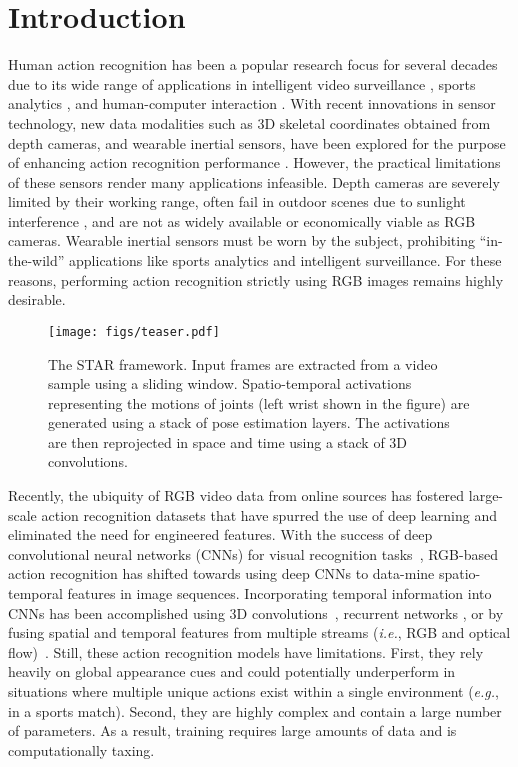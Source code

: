 \documentclass[10pt, conference, compsocconf]{IEEEtran}
\begin{document}
\IEEEpeerreviewmaketitle



\section{Introduction}
Human action recognition has been a popular research focus for several decades due to its wide range of applications in intelligent video surveillance \cite{ji20133d}, sports analytics \cite{fani2017hockey}, and human-computer interaction \cite{mitra2007gesture}. With recent innovations in sensor technology, new data modalities such as 3D skeletal coordinates obtained from depth cameras, and wearable inertial sensors, have been explored for the purpose of enhancing action recognition performance \cite{chen2016fusion, du2015hierarchical, liu2016spatio}. However, the practical limitations of these sensors render many applications infeasible. Depth cameras are severely limited by their working range, often fail in outdoor scenes due to sunlight interference \cite{mehta2017vnect}, and are not as widely available or economically viable as RGB cameras. Wearable inertial sensors must be worn by the subject, prohibiting ``in-the-wild'' applications like sports analytics and intelligent surveillance. For these reasons, performing action recognition strictly using RGB images remains highly desirable. 

\begin{figure}
    \centering
    \texttt{[image: figs/teaser.pdf]}
    \vspace{-10pt}
\caption{The STAR framework. Input frames are extracted from a video sample using a sliding window. Spatio-temporal activations representing the motions of joints (left wrist shown in the figure) are generated using a stack of pose estimation layers. The activations are then reprojected in space and time using a stack of 3D convolutions.}
    \label{fig:teaser}
    \vspace{-15pt}
\end{figure}

Recently, the ubiquity of RGB video data from online sources has fostered large-scale action recognition datasets that have spurred the use of deep learning and eliminated the need for engineered features. With the success of deep convolutional neural networks (CNNs) for visual recognition tasks~\cite{krizhevsky2012imagenet}, RGB-based action recognition has shifted towards using deep CNNs to data-mine spatio-temporal features in image sequences. Incorporating temporal information into CNNs has been accomplished using 3D convolutions~\cite{ji20133d}, recurrent networks \cite{donahue2015long, peng2016multi}, or by fusing spatial and temporal features from multiple streams (\textit{i.e.}, RGB and optical flow)~\cite{karpathy2014large}. Still, these action recognition models have limitations. First, they rely heavily on global appearance cues and could potentially underperform in situations where multiple unique actions exist within a single environment (\textit{e.g.}, in a sports match). Second, they are highly complex and contain a large number of parameters. As a result, training requires large amounts of data and is computationally taxing.
\end{document}
